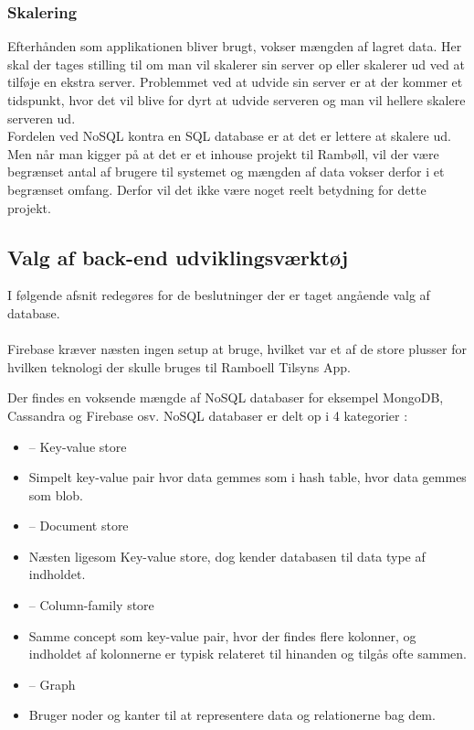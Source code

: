 \subsubsection{Skalering}
Efterhånden som applikationen bliver brugt, vokser mængden af lagret data. Her skal der tages stilling til om man vil skalerer sin server op eller skalerer ud ved at tilføje en ekstra server. Problemmet ved at udvide sin server er at der kommer et tidspunkt, hvor det vil blive for dyrt at udvide serveren og man vil hellere skalere serveren ud. \\
Fordelen ved NoSQL kontra en SQL database er at det er lettere at skalere ud. Men
når man kigger på at det er et inhouse projekt til Rambøll, vil der være begrænset antal af brugere til systemet og mængden af data vokser derfor i et begrænset omfang. 
Derfor vil det ikke være noget reelt betydning for dette projekt.

\subsection{Valg af back-end udviklingsværktøj}
I følgende afsnit redegøres for de beslutninger der er taget angående valg af database. \\ \\
Firebase kræver næsten ingen setup at bruge, hvilket var et af de store plusser for hvilken teknologi der skulle bruges til Ramboell Tilsyns App. 

Der findes en voksende mængde af NoSQL databaser for eksempel MongoDB, Cassandra og Firebase osv.
NoSQL databaser er delt op i 4 kategorier \cite{NoSQLTypes}:
\begin{itemize}[-]
	\itemsep 0.3em 
	\item[]– Key-value store
	\item[] Simpelt key-value pair hvor data gemmes som i hash table, hvor data gemmes som blob. \\
	\item[]– Document store
	\item[] Næsten ligesom Key-value store, dog kender databasen til data type af indholdet.\\
	\item[]– Column-family store 
	\item[] Samme concept som key-value pair, hvor der findes flere kolonner, og indholdet af kolonnerne er typisk relateret til hinanden og tilgås ofte sammen. \\
	\item[]– Graph	
 	\item[] Bruger noder og kanter til at representere data og relationerne bag dem.\\
\end{itemize}	




